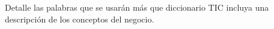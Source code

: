 


Detalle las palabras que se usarán más que diccionario TIC incluya una descripción de los conceptos del negocio.
